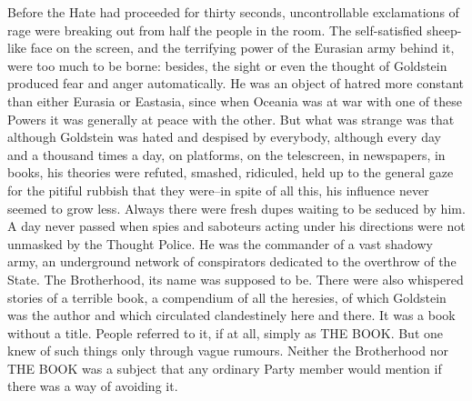 \documentclass{article}
\begin{document}
Before the Hate had proceeded for thirty seconds, uncontrollable
exclamations of rage were breaking out from half the people in the room.
The self-satisfied sheep-like face on the screen, and the terrifying power
of the Eurasian army behind it, were too much to be borne: besides,
the sight or even the thought of Goldstein produced fear and anger
automatically. He was an object of hatred more constant than either Eurasia
or Eastasia, since when Oceania was at war with one of these Powers it was
generally at peace with the other. But what was strange was that although
Goldstein was hated and despised by everybody, although every day and a
thousand times a day, on platforms, on the telescreen, in newspapers,
in books, his theories were refuted, smashed, ridiculed, held up to the
general gaze for the pitiful rubbish that they were--in spite of all this,
his influence never seemed to grow less. Always there were fresh dupes
waiting to be seduced by him. A day never passed when spies and saboteurs
acting under his directions were not unmasked by the Thought Police.
He was the commander of a vast shadowy army, an underground network of
conspirators dedicated to the overthrow of the State. The Brotherhood, its
name was supposed to be. There were also whispered stories of a terrible
book, a compendium of all the heresies, of which Goldstein was the author
and which circulated clandestinely here and there. It was a book without a
title. People referred to it, if at all, simply as THE BOOK. But one knew
of such things only through vague rumours. Neither the Brotherhood nor
THE BOOK was a subject that any ordinary Party member would mention if
there was a way of avoiding it.
\end{document}
